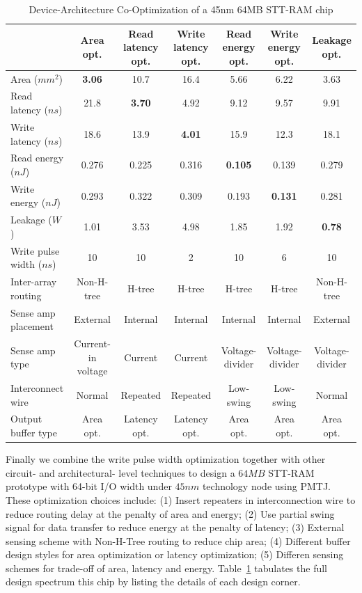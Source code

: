 \begin{table}[t]
\centering
\caption{Device-Architecture Co-Optimization of a 45nm 64MB STT-RAM chip}
\label{tb:bigtable}
\begin{tabular}{| l | c | c | c | c | c | c |}
\hline\hline
& Area opt. & Read latency opt. & Write latency opt. & Read energy opt. & Write energy opt. & Leakage opt. \\
\hline
Area ($mm^2$) & \textbf{3.06} & 10.7 & 16.4 & 5.66 & 6.22 & 3.63 \\
\hline
Read latency ($ns$) & 21.8 & \textbf{3.70} & 4.92 & 9.12 & 9.57 &	9.91 \\
\hline
Write latency ($ns$) & 18.6	& 13.9	& \textbf{4.01}	& 15.9	& 12.3	& 18.1 \\
\hline
Read energy ($nJ$) & 0.276	& 0.225	& 0.316	& \textbf{0.105}	& 0.139	& 0.279 \\
\hline
Write energy ($nJ$) & 0.293	& 0.322	& 0.309	& 0.193	& \textbf{0.131}	& 0.281\\
\hline
Leakage ($W$) & 1.01	& 3.53	& 4.98	& 1.85	& 1.92	& \textbf{0.78}\\
\hline\hline
Write pulse width ($ns$) & 10 & 10 & 2 & 10 & 6 & 10 \\
\hline
Inter-array routing & Non-H-tree & H-tree & H-tree & H-tree & H-tree & Non-H-tree \\
\hline
Sense amp placement & External & Internal & Internal & Internal & Internal & External \\
\hline
Sense amp type & Current-in voltage & Current & Current & Voltage-divider & Voltage-divider & Voltage-divider \\
\hline
Interconnect wire & Normal & Repeated & Repeated & Low-swing & Low-swing & Normal \\
\hline
Output buffer type & Area opt. & Latency opt. & Latency opt. & Area opt. & Area opt. & Area opt. \\
\hline\hline
\end{tabular}
\end{table}

Finally we combine the write pulse width optimization together with other circuit- and architectural- level techniques to design a $64MB$ STT-RAM prototype with 64-bit I/O width under $45nm$ technology node using PMTJ. These optimization choices include: (1) Insert repeaters in interconnection wire to reduce routing delay at the penalty of area and energy; (2) Use partial swing signal for data transfer to reduce energy at the penalty of latency; (3) External sensing scheme with Non-H-Tree routing to reduce chip area; (4) Different buffer design styles for area optimization or latency optimization; (5) Differen sensing schemes for trade-off of area, latency and energy. Table~\ref{tb:bigtable} tabulates the full design spectrum this chip by listing the details of each design corner.

